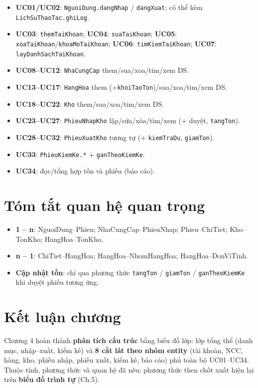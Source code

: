 \begin{itemize}[leftmargin=1.5cm]
    \item \textbf{UC01/UC02}: \texttt{NguoiDung.dangNhap} / \texttt{dangXuat}; có thể kèm \texttt{LichSuThaoTac.ghiLog}.
    \item \textbf{UC03}: \texttt{themTaiKhoan}; \textbf{UC04}: \texttt{suaTaiKhoan}; \textbf{UC05}: \texttt{xoaTaiKhoan}/\texttt{khoaMoTaiKhoan}; \textbf{UC06}: \texttt{timKiemTaiKhoan}; \textbf{UC07}: \texttt{layDanhSachTaiKhoan}.
    \item \textbf{UC08--UC12}: \texttt{NhaCungCap} them/sua/xoa/tim/xem DS.
    \item \textbf{UC13--UC17}: \texttt{HangHoa} them (+\texttt{khoiTaoTon})/sua/xoa/tim/xem DS.
    \item \textbf{UC18--UC22}: \texttt{Kho} them/sua/xoa/tim/xem DS.
    \item \textbf{UC23--UC27}: \texttt{PhieuNhapKho} lập/sửa/xóa/tìm/xem (+ duyệt, \texttt{tangTon}).
    \item \textbf{UC28--UC32}: \texttt{PhieuXuatKho} tương tự (+ \texttt{kiemTraDu}, \texttt{giamTon}).
    \item \textbf{UC33}: \texttt{PhieuKiemKe.*} + \texttt{ganTheoKiemKe}.
    \item \textbf{UC34}: đọc/tổng hợp tồn và phiếu (báo cáo).
\end{itemize}

\section{Tóm tắt quan hệ quan trọng}

\begin{itemize}[leftmargin=1.5cm]
    \item \textbf{1 -- n}: NguoiDung--Phieu; NhaCungCap--PhieuNhap; Phieu--ChiTiet; Kho--TonKho; HangHoa--TonKho.
    \item \textbf{n -- 1}: ChiTiet--HangHoa; HangHoa--NhomHangHoa; HangHoa--DonViTinh.
    \item \textbf{Cập nhật tồn}: chỉ qua phương thức \texttt{tangTon} / \texttt{giamTon} / \texttt{ganTheoKiemKe} khi duyệt phiếu tương ứng.
\end{itemize}

\section{Kết luận chương}

Chương 4 hoàn thành \textbf{phân tích cấu trúc} bằng biểu đồ lớp: lớp tổng thể (danh mục, nhập--xuất, kiểm kê) và \textbf{8 cắt lát theo nhóm entity} (tài khoản, NCC, hàng, kho, phiếu nhập, phiếu xuất, kiểm kê, báo cáo) phủ toàn bộ UC01--UC34. Thuộc tính, phương thức và quan hệ đã nêu; phương thức then chốt xuất hiện lại trên \textbf{biểu đồ trình tự} (Ch.5).
